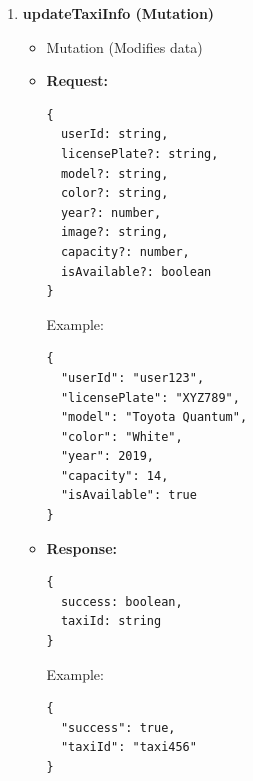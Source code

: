 \documentclass[a4paper,12pt]{article}
\begin{document}
\begin{enumerate}
\begin{itemize}
      \item \textbf{Response:}
      \begin{verbatim}
{
  _id: string,
  driverId: string,
  licensePlate: string,
  model: string,
  capacity: number,
  image: string | null
} | null
      \end{verbatim}
      Example:
      \begin{verbatim}
{
  "_id": "taxi456",
  "driverId": "driver789",
  "licensePlate": "XYZ789",
  "model": "Toyota Quantum",
  "capacity": 14,
  "image": "https://example.com/taxi.jpg"
}
      \end{verbatim}

      \item \textbf{Effect:}
      \begin{itemize}
        \item Given a driver's user ID, this query retrieves the taxi assigned to that driver.
        \item If no driver profile is found for the given user ID, it returns \texttt{null}.
        \item If a driver exists but no taxi is assigned, it also returns \texttt{null}.
      \end{itemize}
    \end{itemize}

\item \textbf{updateTaxiInfo (Mutation)}
    \begin{itemize}
      \item Mutation (Modifies data)
      \item \textbf{Request:}
      \begin{verbatim}
{
  userId: string,
  licensePlate?: string,
  model?: string,
  color?: string,
  year?: number,
  image?: string,
  capacity?: number,
  isAvailable?: boolean
}
      \end{verbatim}
      Example:
      \begin{verbatim}
{
  "userId": "user123",
  "licensePlate": "XYZ789",
  "model": "Toyota Quantum",
  "color": "White",
  "year": 2019,
  "capacity": 14,
  "isAvailable": true
}
      \end{verbatim}

      \item \textbf{Response:}
      \begin{verbatim}
{
  success: boolean,
  taxiId: string
}
      \end{verbatim}
      Example:
      \begin{verbatim}
{
  "success": true,
  "taxiId": "taxi456"
}
      \end{verbatim}


\end{itemize}
\end{enumerate}
\end{document}
